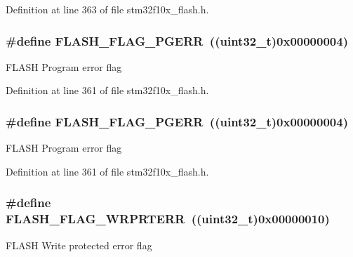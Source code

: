 Definition at line 363 of file stm32f10x\+\_\+flash.\+h.

\subsubsection[{\texorpdfstring{F\+L\+A\+S\+H\+\_\+\+F\+L\+A\+G\+\_\+\+P\+G\+E\+RR}{FLASH_FLAG_PGERR}}]{\setlength{\rightskip}{0pt plus 5cm}\#define F\+L\+A\+S\+H\+\_\+\+F\+L\+A\+G\+\_\+\+P\+G\+E\+RR~(({\bf uint32\+\_\+t})0x00000004)}\hypertarget{group___f_l_a_s_h___flags_gae2ef62dee0a5ca01e6226746039b6f20}{}\label{group___f_l_a_s_h___flags_gae2ef62dee0a5ca01e6226746039b6f20}
F\+L\+A\+SH Program error flag 

Definition at line 361 of file stm32f10x\+\_\+flash.\+h.

\subsubsection[{\texorpdfstring{F\+L\+A\+S\+H\+\_\+\+F\+L\+A\+G\+\_\+\+P\+G\+E\+RR}{FLASH_FLAG_PGERR}}]{\setlength{\rightskip}{0pt plus 5cm}\#define F\+L\+A\+S\+H\+\_\+\+F\+L\+A\+G\+\_\+\+P\+G\+E\+RR~(({\bf uint32\+\_\+t})0x00000004)}\hypertarget{group___f_l_a_s_h___flags_gae2ef62dee0a5ca01e6226746039b6f20}{}\label{group___f_l_a_s_h___flags_gae2ef62dee0a5ca01e6226746039b6f20}
F\+L\+A\+SH Program error flag 

Definition at line 361 of file stm32f10x\+\_\+flash.\+h.

\subsubsection[{\texorpdfstring{F\+L\+A\+S\+H\+\_\+\+F\+L\+A\+G\+\_\+\+W\+R\+P\+R\+T\+E\+RR}{FLASH_FLAG_WRPRTERR}}]{\setlength{\rightskip}{0pt plus 5cm}\#define F\+L\+A\+S\+H\+\_\+\+F\+L\+A\+G\+\_\+\+W\+R\+P\+R\+T\+E\+RR~(({\bf uint32\+\_\+t})0x00000010)}\hypertarget{group___f_l_a_s_h___flags_ga5c59a7f07507cac38091275964d3d35d}{}\label{group___f_l_a_s_h___flags_ga5c59a7f07507cac38091275964d3d35d}
F\+L\+A\+SH Write protected error flag 

